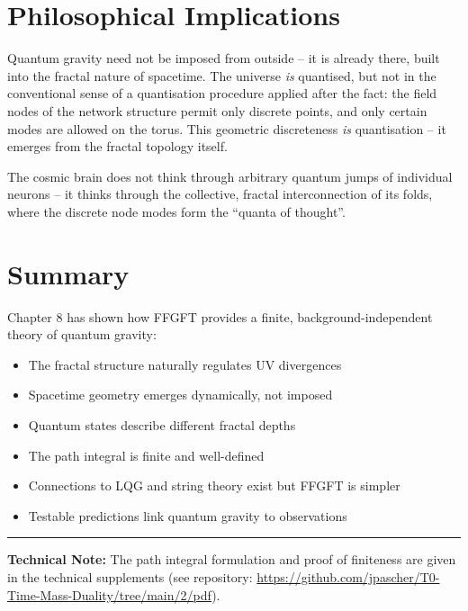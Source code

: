 	\section{Philosophical Implications}
	
	Quantum gravity need not be imposed from outside -- it is already there, built into the fractal nature of spacetime. The universe \textit{is} quantised, but not in the conventional sense of a quantisation procedure applied after the fact: the field nodes of the network structure permit only discrete points, and only certain modes are allowed on the torus. This geometric discreteness \textit{is} quantisation -- it emerges from the fractal topology itself.
	
	The cosmic brain does not think through arbitrary quantum jumps of individual neurons -- it thinks through the collective, fractal interconnection of its folds, where the discrete node modes form the ``quanta of thought''.
	
	\section{Summary}
	
	Chapter 8 has shown how FFGFT provides a finite, background-independent theory of quantum gravity:
	
	\begin{itemize}[leftmargin=*]
		\item The fractal structure naturally regulates UV divergences
		\item Spacetime geometry emerges dynamically, not imposed
		\item Quantum states describe different fractal depths
		\item The path integral is finite and well-defined
		\item Connections to LQG and string theory exist but FFGFT is simpler
		\item Testable predictions link quantum gravity to observations
	\end{itemize}
	
	\vspace{1cm}
	\hrule
	\vspace{0.5cm}
	\noindent\textbf{Technical Note:} The path integral formulation and proof of finiteness are given in the technical supplements (see repository: \url{https://github.com/jpascher/T0-Time-Mass-Duality/tree/main/2/pdf}).



